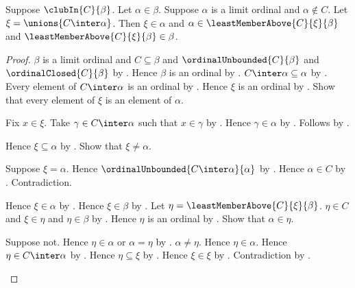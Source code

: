\begin{theorem}\label{closed_club_gap_straddles}
    Suppose $\clubIn{C}{\beta}$.
    Let $\alpha\in\beta$.
    Suppose $\alpha$ is a limit ordinal and $\alpha\notin C$.
    Let $\xi=\unions{C\inter\alpha}$.
    Then $\xi\in\alpha$ and
        $\alpha\in\leastMemberAbove{C}{\xi}{\beta}$ and
        $\leastMemberAbove{C}{\xi}{\beta}\in\beta$.
\end{theorem}
\begin{proof}
    $\beta$ is a limit ordinal and $C\subseteq\beta$ and
        $\ordinalUnbounded{C}{\beta}$ and $\ordinalClosed{C}{\beta}$
        by .
    Hence $\beta$ is an ordinal by .
    $C\inter\alpha\subseteq\alpha$ by .
    Every element of $C\inter\alpha$ is an ordinal
        by .
    Hence $\xi$ is an ordinal by .
    Show that every element of $\xi$ is an element of $\alpha$.
    \begin{subproof}
        Fix $x\in\xi$.
        Take $\gamma\in C\inter\alpha$ such that $x\in\gamma$
            by .
        Hence $\gamma\in\alpha$ by .
        Follows by .
    \end{subproof}
    Hence $\xi\subseteq\alpha$ by .
    Show that $\xi\neq\alpha$.
    \begin{subproof}
        Suppose $\xi=\alpha$.
        Hence $\ordinalUnbounded{C\inter\alpha}{\alpha}$
            by .
        Hence $\alpha\in C$ by .
        Contradiction.
    \end{subproof}
    Hence $\xi\in\alpha$
        by .
    Hence $\xi\in\beta$ by .
    Let $\eta=\leastMemberAbove{C}{\xi}{\beta}$.
    $\eta\in C$ and $\xi\in\eta$ and $\eta\in\beta$
        by .
    Hence $\eta$ is an ordinal
        by .
    Show that $\alpha\in\eta$.
    \begin{subproof}
        Suppose not.
        Hence $\eta\in\alpha$ or $\alpha=\eta$
            by .
        $\alpha\neq\eta$.
        Hence $\eta\in\alpha$.
        Hence $\eta\in C\inter\alpha$ by .
        Hence $\eta\subseteq\xi$ by .
        Hence $\xi\in\xi$ by .
        Contradiction by .
    \end{subproof}
\end{proof}

